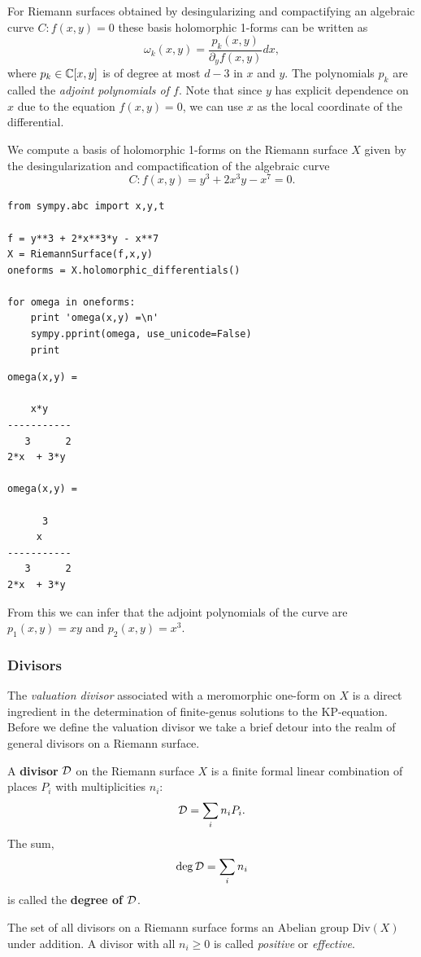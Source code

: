 For Riemann surfaces obtained by desingularizing and compactifying an algebraic
curve $C : f(x,y) = 0$ these basis holomorphic 1-forms can be written as
\begin{equation*}
  \omega_k(x,y) = \frac{p_k(x,y)}{\partial_y f(x,y)} dx,
\end{equation*}
where $p_k \in \operatorname{\mathbb{C}}[x,y]$ is of degree at most $d-3$ in $x$ and $y$. The
polynomials $p_k$ are called the {\it adjoint polynomials of $f$}. Note that
since $y$ has explicit dependence on $x$ due to the equation $f(x,y) = 0$, we
can use $x$ as the local coordinate of the differential.

We compute a basis of holomorphic 1-forms on the Riemann surface $X$ given by
the desingularization and compactification of the algebraic curve
\[
  C : f(x,y) = y^3 + 2x^3y - x^7 = 0.
\]
\begin{lstlisting}
from sympy.abc import x,y,t

f = y**3 + 2*x**3*y - x**7
X = RiemannSurface(f,x,y)
oneforms = X.holomorphic_differentials()

for omega in oneforms:
    print 'omega(x,y) =\n'
    sympy.pprint(omega, use_unicode=False)
    print
\end{lstlisting}
\begin{lstlisting}
omega(x,y) =

    x*y    
-----------
   3      2
2*x  + 3*y 

omega(x,y) =

      3    
     x     
-----------
   3      2
2*x  + 3*y
\end{lstlisting}
From this we can infer that the adjoint polynomials of the curve are $p_1(x,y) =
xy$ and $p_2(x,y) = x^3$.

\subsubsection{Divisors}\label{subsec:background-divisors}

The {\it valuation divisor} associated with a meromorphic one-form on $X$ is a
direct ingredient in the determination of finite-genus solutions to the
KP-equation. Before we define the valuation divisor we take a brief detour into
the realm of general divisors on a Riemann surface.

\begin{definition}
  A {\bf divisor} $\operatorname{\mathcal{D}}$ on the Riemann surface $X$ is a finite formal linear
  combination of places $P_i$ with multiplicities $n_i$:
  \begin{equation}
    \operatorname{\mathcal{D}} = \sum_i n_i P_i.
  \end{equation}
  The sum,
  \begin{equation}
    \deg \operatorname{\mathcal{D}} = \sum_i n_i
  \end{equation}
  is called the {\bf degree of $\operatorname{\mathcal{D}}$}.
\end{definition}
The set of all divisors on a Riemann surface forms an Abelian group
$\text{Div}(X)$ under addition. A divisor with all $n_i \geq 0$ is called {\it
  positive} or {\it effective}.



